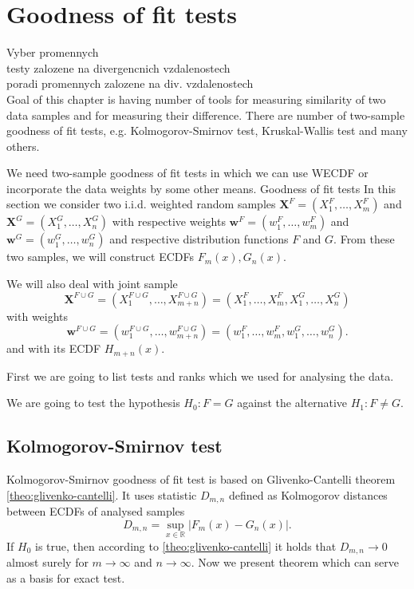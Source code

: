 \chapter{Goodness of fit tests}
\label{ch:GoF}

Vyber promennych \\
testy zalozene na divergencnich vzdalenostech \\
poradi promennych zalozene na div. vzdalenostech\\

Goal of this chapter is having number of tools for measuring similarity of two data samples and for measuring their difference. There are number of two-sample goodness of fit  tests, e.g. Kolmogorov-Smirnov test, Kruskal-Wallis test and many others. 

We need two-sample goodness of fit  tests in which we can use WECDF or incorporate the data weights by some other means.
Goodness of fit tests 
In this section we consider two i.i.d. weighted random samples $\mathbf{X}^F = (X^F_1,\ldots, X^F_m)$ and $\mathbf{X}^G = (X^G_1, \ldots, X^G_n)$ with respective weights $\mathbf{w}^F = (w^F_1,\ldots, w^F_m)$ and $\mathbf{w}^G = (w^G_1,\ldots, w^G_n)$ and respective distribution functions $F$ and $G$. From these two samples, we will construct ECDFs $F_m(x), G_n(x).$ 

We will also deal with joint sample 
\begin{equation}
\mathbf{X}^{F\cup G} = (X^{F\cup G}_1, \ldots, X^{F\cup G}_{m+n}) = (X^{F}_1, \ldots, X^{F}_{m},X^G_1,\ldots, X^G_n)
\end{equation}
with weights 
\begin{equation}
\mathbf{w}^{F\cup G} = (w^{F\cup G}_1,\ldots, w^{F\cup G}_{m+n}) = (w^{F}_1,\ldots, w^{F}_{m},w^{G}_1,\ldots, w^{G}_{n}).
\end{equation}
and with its ECDF $H_{m+n}(x)$.

First we are going to list  tests and ranks which we used for analysing the data.

We are going to test the hypothesis $H_0: F = G$ against the alternative $H_1: F \neq G$. 
\section{Kolmogorov-Smirnov test}
Kolmogorov-Smirnov goodness of fit test is based on Glivenko-Cantelli theorem \ref{theo:glivenko-cantelli}. It uses statistic $D_{m,n}$ defined as Kolmogorov distances between ECDFs of analysed samples
\begin{equation}
D_{m,n} = \sup_{x \in \mathbb{R}} |F_m(x) - G_n(x)|.
\end{equation}
If $H_0$ is true, then according to \ref{theo:glivenko-cantelli} it holds that $D_{m,n} \rightarrow 0$ almost surely for $m \rightarrow \infty$ and $n \rightarrow \infty$. Now we present theorem which can serve as a basis for exact test.

